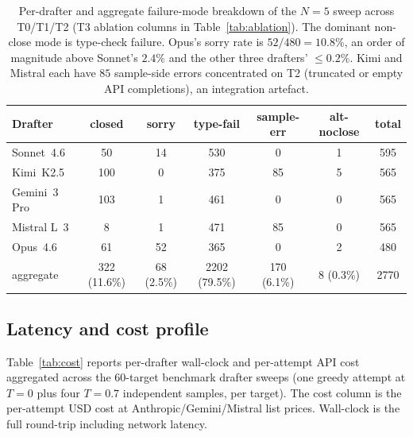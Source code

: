 \begin{table}[!t]
\centering
\small
\caption{Per-drafter and aggregate failure-mode breakdown of
the $N=5$ sweep across T0/T1/T2 (T3 ablation columns in
Table~\ref{tab:ablation}). The dominant non-close mode is
type-check failure. Opus's sorry rate is $52/480 = 10.8\%$,
an order of magnitude above Sonnet's $2.4\%$ and the other
three drafters' $\leq 0.2\%$. Kimi and Mistral each have $85$
sample-side errors concentrated on T2 (truncated or empty API
completions), an integration artefact.}
\label{tab:failure-modes}
\begin{tabular}{lcccccc}
\toprule
Drafter & closed & sorry & type-fail & sample-err & alt-noclose & total \\
\midrule
Sonnet~4.6  & 50  & 14 & 530 & 0   & 1 & 595 \\
Kimi~K2.5   & 100 & 0  & 375 & 85  & 5 & 565 \\
Gemini~3 Pro & 103 & 1  & 461 & 0   & 0 & 565 \\
Mistral L~3 & 8   & 1  & 471 & 85  & 0 & 565 \\
Opus~4.6    & 61  & 52 & 365 & 0   & 2 & 480 \\
\midrule
aggregate   & 322 (11.6\%) & 68 (2.5\%) & 2202 (79.5\%) & 170 (6.1\%) & 8 (0.3\%) & 2770 \\
\bottomrule
\end{tabular}

\end{table}

\subsection{Latency and cost profile}
\label{app:cost}

Table~\ref{tab:cost} reports per-drafter wall-clock and
per-attempt API cost aggregated across the $60$-target benchmark
drafter sweeps (one greedy attempt at $T=0$ plus four
$T=0.7$ independent samples, per target). The cost column
is the per-attempt USD cost at Anthropic/Gemini/Mistral list
prices. Wall-clock is the full round-trip including network
latency.

